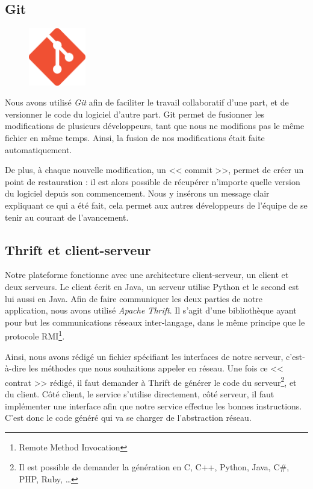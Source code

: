 \subsection{Git}
\begin{figure}
\vspace{-15px}
	\includegraphics[width=2.5cm]{contents/images/logoGit.png}
\end{figure}
Nous avons utilisé \textit{Git} afin de faciliter le travail collaboratif d'une part, et de versionner le code du logiciel d'autre part. Git permet de fusionner les
modifications de plusieurs développeurs, tant que nous ne modifions pas le même fichier en même temps. Ainsi, la fusion de nos modifications était faite automatiquement. 

De plus, à chaque nouvelle modification, un << commit >>, permet de créer un point de restauration : il est alors possible de
récupérer n'importe quelle version du logiciel depuis son commencement. Nous y insérons un message clair expliquant ce qui a été fait, cela permet aux autres développeurs de l'équipe de se tenir au courant de l'avancement.

\subsection{Thrift et client-serveur}\label{thrift}
Notre plateforme fonctionne avec une architecture client-serveur, un client et deux serveurs. Le client écrit en Java, un serveur utilise
Python et le second est lui aussi en Java. Afin de faire communiquer les deux parties de notre application, nous avons utilisé \textit{Apache Thrift}. Il s'agit d'une bibliothèque ayant pour but les communications réseaux inter-langage, dans le même principe que le protocole RMI\footnote{Remote Method Invocation}.

Ainsi, nous avons rédigé un fichier spécifiant les interfaces de notre serveur, c'est-à-dire les méthodes que nous souhaitions appeler en réseau. Une fois ce << contrat >> rédigé, il faut demander à Thrift de générer le code du serveur\footnote{Il est possible de demander la génération en C, C++, Python, Java, C\#, PHP, Ruby, \ldots}, et du client. Côté client, le service s'utilise directement, côté serveur, il faut implémenter une interface afin que notre service effectue les bonnes instructions. C'est donc le code généré qui va se charger de l'abstraction réseau.

